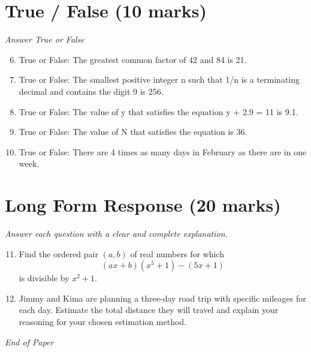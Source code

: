 \documentclass[12pt]{article}
\begin{document}
\section*{True / False (10 marks)}
\textit{Answer True or False}
\begin{enumerate}[label=\arabic*.]
\setcounter{enumi}{5}
\item True or False: The greatest common factor of 42 and 84 is 21.
\item True or False: The smallest positive integer n such that 1/n is a terminating decimal and contains the digit 9 is 256.
\item True or False: The value of y that satisfies the equation y + 2.9 = 11 is 9.1.
\item True or False: The value of N that satisfies the equation is 36.
\item True or False: There are 4 times as many days in February as there are in one week.
\end{enumerate}

\section*{Long Form Response (20 marks)}
\textit{Answer each question with a clear and complete explanation.}
\begin{enumerate}[label=\arabic*.]
\setcounter{enumi}{10}
\item Find the ordered pair $(a,b)$ of real numbers for which \[(ax + b)(x^5 + 1) - (5 x + 1)\]is divisible by $x^2 + 1.$
\item Jimmy and Kima are planning a three-day road trip with specific mileages for each day. Estimate the total distance they will travel and explain your reasoning for your chosen estimation method.
\end{enumerate}

\vfill
\noindent\textit{End of Paper}
\end{document}
